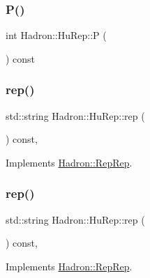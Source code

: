 \subsubsection{\texorpdfstring{P()}{P()}}
{\footnotesize\ttfamily int Hadron\+::\+Hu\+Rep\+::P (\begin{DoxyParamCaption}{ }\end{DoxyParamCaption}) const\hspace{0.3cm}{\ttfamily [inline]}}

\mbox{\label{structHadron_1_1HuRep_a4c8b93e1cd7db1a4bacd489f7bb90dbd}} 
\subsubsection{\texorpdfstring{rep()}{rep()}\hspace{0.1cm}{\footnotesize\ttfamily [1/3]}}
{\footnotesize\ttfamily std\+::string Hadron\+::\+Hu\+Rep\+::rep (\begin{DoxyParamCaption}{ }\end{DoxyParamCaption}) const\hspace{0.3cm}{\ttfamily [inline]}, {\ttfamily [virtual]}}



Implements \mbox{\hyperlink{structHadron_1_1RepRep_ab3213025f6de249f7095892109575fde}{Hadron\+::\+Rep\+Rep}}.

\mbox{\label{structHadron_1_1HuRep_a4c8b93e1cd7db1a4bacd489f7bb90dbd}} 
\subsubsection{\texorpdfstring{rep()}{rep()}\hspace{0.1cm}{\footnotesize\ttfamily [2/3]}}
{\footnotesize\ttfamily std\+::string Hadron\+::\+Hu\+Rep\+::rep (\begin{DoxyParamCaption}{ }\end{DoxyParamCaption}) const\hspace{0.3cm}{\ttfamily [inline]}, {\ttfamily [virtual]}}



Implements \mbox{\hyperlink{structHadron_1_1RepRep_ab3213025f6de249f7095892109575fde}{Hadron\+::\+Rep\+Rep}}.

